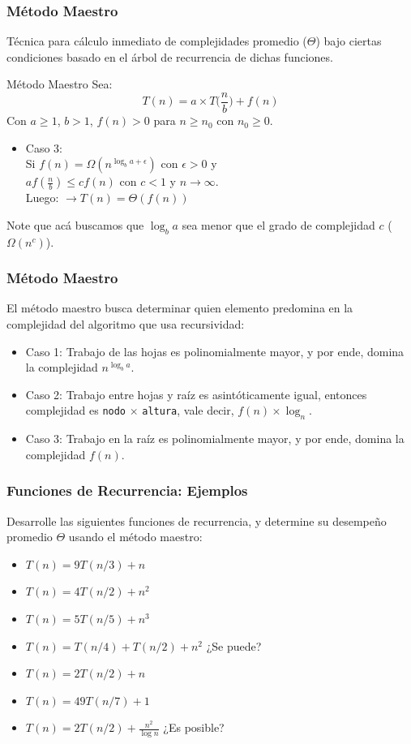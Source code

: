 \documentclass{beamer}
\begin{document}
\begin{frame}[fragile]
 \frametitle{Método Maestro}
\small Técnica para cálculo inmediato de complejidades promedio ($\Theta$) bajo ciertas condiciones basado en el árbol de recurrencia de dichas funciones.

\begin{alertblock}{Método Maestro}
Sea: 
$$ T(n) = a \times T\Big(\frac{n}{b}\Big) + f(n) $$
Con $a \geq 1$, $b > 1$, $f(n) > 0 $ para $n \geq n_0$ con $n_0 \geq 0$. 
\begin{itemize}
\item Caso 3:\\
\smallskip
Si $f(n) = \Omega(n^{\log_b a + \epsilon})$ con $\epsilon > 0$ y\\
$a f(\frac{n}{b}) \leq c f(n)$ con $c < 1$ y $n \rightarrow \infty$.\\\pause
Luego: 
$\rightarrow T(n) = \Theta(f(n))$
\end{itemize}
\end{alertblock}
Note que acá buscamos que $\log_b a$ sea menor que el grado de complejidad $c$ ($\Omega(n^c)$).
\end{frame}

\begin{frame}[fragile]
 \frametitle{Método Maestro}
El método maestro busca determinar quien elemento predomina en la complejidad del algoritmo que usa recursividad:
\begin{itemize}
\item Caso 1: Trabajo de las hojas es polinomialmente mayor, y por ende, domina la complejidad $n^{\log_b a}$.
\item Caso 2: Trabajo entre hojas y raíz es asintóticamente igual, entonces complejidad es \texttt{nodo} $\times$ \texttt{altura}, vale decir, $f(n) \times \log_n$.
\item Caso 3: Trabajo en la raíz es polinomialmente mayor, y por ende, domina la complejidad $f(n)$.
\end{itemize}
\end{frame}


\begin{frame}[fragile]
 \frametitle{Funciones de Recurrencia: Ejemplos}
\small
Desarrolle las siguientes funciones de recurrencia, y determine su desempeño promedio $\Theta$ usando el método maestro:
\begin{itemize}
\item $T(n) = 9T(n/3) + n$
\item $T(n) = 4T(n/2) + n^2 $
\item $T(n) = 5T(n/5) + n^3 $
\item $T(n) = T(n/4) + T(n/2) + n^2$ ¿Se puede?
\item $T(n) = 2T(n/2) + n$
\item $T(n) = 49T(n/7) + 1$ 
\item $T(n) = 2T(n/2) + \frac{n^2}{\log n}$ ¿Es posible?
\end{itemize}
\end{frame}
\end{document}
